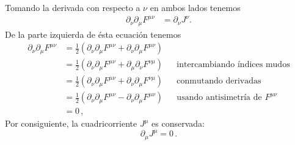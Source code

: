  
\begin{frame}
Tomando la derivada con respecto a $\nu$ en ambos lados tenemos
\begin{align}
   \partial_\nu\partial_\mu F^{\mu\nu}&=\partial_\nu J^\nu.
\end{align}
De la parte izquierda de ésta ecuación tenemos
\begin{align*}
  \partial_\nu\partial_\mu F^{\mu\nu}&=\tfrac{1}{2}\left(\partial_\nu\partial_\mu F^{\mu\nu}+\partial_\nu\partial_\mu F^{\mu\nu}  \right)\nonumber\\
&=\tfrac{1}{2}\left(\partial_\nu\partial_\mu F^{\mu\nu}+\partial_\mu\partial_\nu F^{\nu\mu}  \right)
&&\text{intercambiando índices mudos}\nonumber\\
&=\tfrac{1}{2}\left(\partial_\nu\partial_\mu F^{\mu\nu}+\partial_\nu\partial_\mu F^{\nu\mu}  \right)
&&\text{conmutando derivadas}\nonumber\\
&=\tfrac{1}{2}\left(\partial_\nu\partial_\mu F^{\mu\nu}-\partial_\nu\partial_\mu F^{\mu\nu}  \right)
&&\text{usando antisimetría de $F^{\mu\nu}$}\nonumber\\
&=0\,,
\end{align*}
Por consiguiente, la cuadricorriente $J^\mu$ es conservada:
\begin{equation}
  \label{eq:consvjmu}
  \partial_\mu J^\mu=0\,.
\end{equation}



\end{frame}
